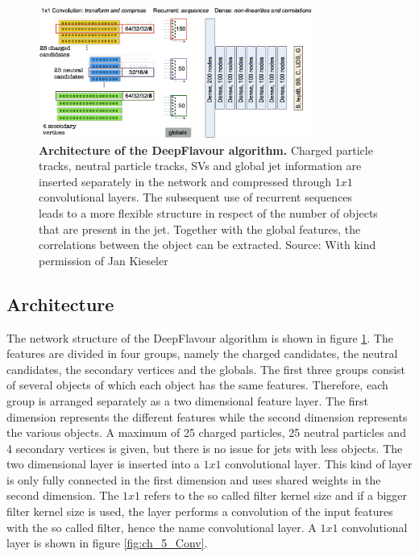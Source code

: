\begin{figure}
\centering
\includegraphics[width=0.8\textwidth]{chapter_5_tagging/DF.png}
\caption[Architecture of the DeepFlavour Algorithm]{\textbf{Architecture of the DeepFlavour algorithm.} Charged particle tracks, neutral particle tracks, SVs and global jet information are inserted separately in the network and compressed through $1x1$ convolutional layers. The subsequent use of recurrent sequences leads to a more flexible structure in respect of the number of objects that are present in the jet. Together with the global features, the correlations between the object can be extracted. Source: With kind permission of Jan Kieseler}
\label{fig:ch_5_DF}
\end{figure}

\subsection{Architecture}
The network structure of the DeepFlavour algorithm is shown in figure \ref{fig:ch_5_DF}. The features are divided in four groups, namely the charged candidates, the neutral candidates, the secondary vertices and the globals. The first three groups consist of several objects of which each object has the same features. Therefore, each group is arranged separately as a two dimensional feature layer. The first dimension represents the different features while the second dimension represents the various objects. A maximum of 25 charged particles, 25 neutral particles and 4 secondary vertices is given, but there is no issue for jets with less objects. The two dimensional layer is inserted into a $1x1$ convolutional layer. This kind of layer is only fully connected in the first dimension and uses shared weights in the second dimension. The $1x1$ refers to the so called filter kernel size and if a bigger filter kernel size is used, the layer performs a convolution of the input features with the so called filter, hence the name convolutional layer. A $1x1$ convolutional layer is shown in figure \ref{fig:ch_5_Conv}.\\

